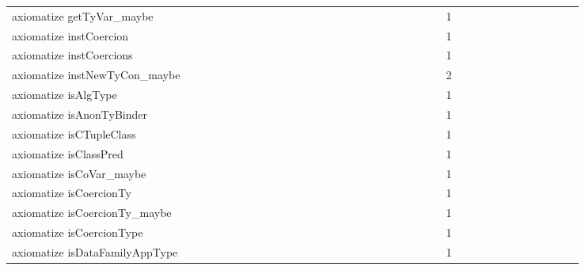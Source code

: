{\begin{tabular}{l|rrr|rrr|rrr}
axiomatize getTyVar_maybe &  &  &  &  &  &  &  &  &  &  &  &  &  &  &  &  &  &  &  &  &  &  &  & 1 &  &  &  &  &  &  &  &  &  &  &  & \\
axiomatize instCoercion &  &  &  &  &  &  &  &  &  &  &  &  &  &  &  &  &  &  &  &  &  &  &  & 1 &  &  &  &  &  &  &  &  &  &  &  & \\
axiomatize instCoercions &  &  &  &  &  &  &  &  &  &  &  &  &  &  &  &  &  &  &  &  &  &  &  & 1 &  &  &  &  &  &  &  &  &  &  &  & \\
axiomatize instNewTyCon_maybe &  &  &  &  &  &  &  &  &  &  &  &  &  &  &  &  &  &  &  &  &  &  &  & 2 &  &  &  &  &  &  &  &  &  &  &  & \\
axiomatize isAlgType &  &  &  &  &  &  &  &  &  &  &  &  &  &  &  &  &  &  &  &  &  &  &  & 1 &  &  &  &  &  &  &  &  &  &  &  & \\
axiomatize isAnonTyBinder &  &  &  &  &  &  &  &  &  &  &  &  &  &  &  &  &  &  &  &  &  &  &  & 1 &  &  &  &  &  &  &  &  &  &  &  & \\
axiomatize isCTupleClass &  &  &  &  &  &  &  &  &  &  &  &  &  &  &  &  &  &  &  &  &  &  &  & 1 &  &  &  &  &  &  &  &  &  &  &  & \\
axiomatize isClassPred &  &  &  &  &  &  &  &  &  &  &  &  &  &  &  &  &  &  &  &  &  &  &  & 1 &  &  &  &  &  &  &  &  &  &  &  & \\
axiomatize isCoVar_maybe &  &  &  &  &  &  &  &  &  &  &  &  &  &  &  &  &  &  &  &  &  &  &  & 1 &  &  &  &  &  &  &  &  &  &  &  & \\
axiomatize isCoercionTy &  &  &  &  &  &  &  &  &  &  &  &  &  &  &  &  &  &  &  &  &  &  &  & 1 &  &  &  &  &  &  &  &  &  &  &  & \\
axiomatize isCoercionTy_maybe &  &  &  &  &  &  &  &  &  &  &  &  &  &  &  &  &  &  &  &  &  &  &  & 1 &  &  &  &  &  &  &  &  &  &  &  & \\
axiomatize isCoercionType &  &  &  &  &  &  &  &  &  &  &  &  &  &  &  &  &  &  &  &  &  &  &  & 1 &  &  &  &  &  &  &  &  &  &  &  & \\
axiomatize isDataFamilyAppType &  &  &  &  &  &  &  &  &  &  &  &  &  &  &  &  &  &  &  &  &  &  &  & 1 &  &  &  &  &  &  &  &  &  &  &  & \\

\end{tabular}}
